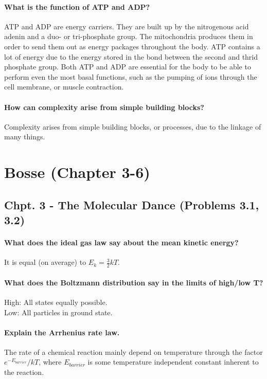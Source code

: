 \documentclass[a4paper,12pt]{article}
\begin{document}
      \paragraph{What is the function of ATP and ADP?\\}
         ATP and ADP are energy carriers. They are built up by the nitrogenous
         acid adenin and a duo- or tri-phosphate group. The mitochondria
         produces them in order to send them out as energy packages throughout
         the body. ATP contains a lot of energy due to the energy stored in the
         bond between the second and thrid phosphate group. Both ATP and ADP are
         essential for the body to be able to perform even the most basal
         functions, such as the pumping of ions through the cell membrane, or
         muscle contraction.

      \paragraph{How can complexity arise from simple building blocks?\\}
         Complexity arises from simple building blocks, or processes, due to the
         linkage of many things. 

   \section{Bosse (Chapter 3-6)}
      \subsection{Chpt. 3 - The Molecular Dance (Problems 3.1, 3.2)}
            \paragraph{
                  What does the ideal gas law say about the mean kinetic energy?
               }
               It is equal (on average) to $E_k = \frac{3}{2}kT$.
            \paragraph{
                  What does the Boltzmann distribution say in the limits of high/low T?
               }
                  High: All states equally possible. \\
                  Low: All particles in ground state.
            \paragraph{
               Explain the Arrhenius rate law.
            }
               The rate of a chemical reaction mainly depend on temperature
               through the factor $e^{-E_{barrier}}/kT$, where $E_{barrier}$ is
               some temperature independent constant inherent to the reaction.
\end{document}
